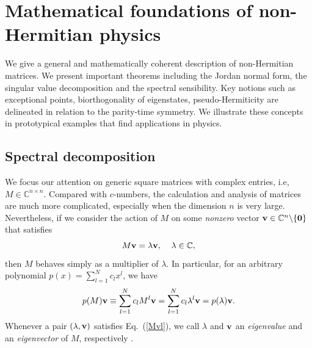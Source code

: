 \documentclass{tADP2e}
\theoremstyle{plain}
\theoremstyle{plain}
\theoremstyle{definition}
\begin{document}
\section{Mathematical foundations of non-Hermitian physics\label{sec2}}
We give a general and mathematically coherent description of non-Hermitian matrices. We present important theorems including the Jordan normal form, the singular value decomposition and the spectral sensibility. Key notions such as exceptional points, biorthogonality of eigenstates, pseudo-Hermiticity are delineated in relation to the parity-time symmetry. We illustrate these concepts in prototypical examples that find applications in physics.

\subsection{Spectral decomposition\label{secspecdec}}

\vspace{3pt}
\noindent
We focus our attention on generic square matrices with complex entries, i.e, $M\in\mathbb{C}^{n\times n}$. Compared with $c$-numbers, the calculation and analysis of matrices are much more complicated, especially when the dimension $n$ is very large. Nevertheless, if we consider the action of $M$ on some \emph{nonzero} vector $\bold{v}\in\mathbb{C}^n\backslash\{\bold{0}\}$ that satisfies 
\begin{equation}
M\bold{v}=\lambda \bold{v},\;\;\;\; \lambda\in\mathbb{C},
\label{Mvl}
\end{equation}
then $M$ behaves simply as a multiplier of $\lambda$. In particular, for an arbitrary polynomial $p(x)=\sum^N_{l=1}c_lx^l$, we have
\begin{equation}
p(M)\bold{v}\equiv\sum^N_{l=1} c_l M^l\bold{v}=\sum^N_{l=1}c_l\lambda^l\bold{v}=p(\lambda)\bold{v}.
\end{equation}
Whenever a pair $(\lambda,\bold{v})$ satisfies Eq.~(\ref{Mvl}), we call $\lambda$ and $\bold{v}$ an \emph{eigenvalue} and an \emph{eigenvector} of $M$, respectively \cite{CDM00}. 
\end{document}
